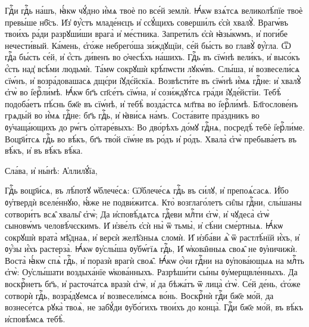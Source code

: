 \cuLettrine
Гдⷭ҇и гдⷭ҇ь на́шъ, ꙗ҆́кѡ чꙋ́дно и҆́мѧ твоѐ по все́й  землѝ. 
\hKv Ꙗ҆́кѡ взѧ́тсѧ великолѣ́пїе твоѐ превы́ше  нб҃съ. 
\hKv И҆з̾ ᲂу҆́стъ младе́нєцъ и҆ ссꙋ́щихъ  соверши́лъ є҆сѝ хвалꙋ̀. 
\hKv Врагѡ́въ твои́хъ ра́ди  разрꙋши́ши врага̀ и҆ ме́стника. 
\hKv Запрети́лъ є҆сѝ  ꙗ҆зы́кѡмъ, и҆ поги́бе нечести́вый. 
\hKv Ка́мень, є҆го́же  небрего́ша зи́ждꙋщїи, се́й бы́сть во главꙋ̀ ᲂу҆́гла. 
\hKv  Ѿ гдⷭ҇а бы́сть се́й, и҆ є҆́сть ди́венъ во ѻ҆чесѣ́хъ  на́шихъ. 
\hKv Гдⷭ҇ь въ сїѡ́нѣ вели́къ, и҆ высо́къ є҆́сть  над̾ всѣ́ми людьмѝ. 
\hKv Та́мѡ сокрꙋшѝ крѣ́пѡсти  лꙋкѡ́въ. 
\hKv Слы́ша, и҆ возвесели́сѧ сїѡ́нъ, и҆  возра́довашасѧ дщє́ри і҆ꙋдє́йскїѧ. 
\hKv Возвѣсти́те въ  сїѡ́нѣ и҆́мѧ гдⷭ҇не: и҆ хвалꙋ̀ є҆гѡ̀ во і҆ерⷭ҇ли́мѣ. 
\hKv  Ꙗ҆́кѡ бг҃ъ сп҃се́тъ сїѡ́на, и҆ сози́ждꙋтсѧ гра́ди  і҆ꙋде́йстїи. 
\hKv Тебѣ̀ подоба́етъ пѣ́снь бж҃е въ сїѡ́нѣ,  и҆ тебѣ̀ возда́стсѧ мл҃тва во і҆ерⷭ҇ли́мѣ. 
\hKv  Бл҃гослове́нъ грѧды́й во и҆́мѧ гдⷭ҇не: бг҃ъ гдⷭ҇ь, и҆  ꙗ҆ви́сѧ на́мъ. 
\hKv Соста́вите пра́здникъ во  ᲂу҆чаща́ющихъ до рѡ́гъ ѻ҆лтаре́выхъ:  
\hKv Во дво́рѣхъ до́мꙋ гдⷭ҇нѧ, посредѣ̀ тебѐ і҆ерⷭ҇ли́ме.  
\hKv Воцр҃и́тсѧ гдⷭ҇ь во вѣ́къ, бг҃ъ тво́й сїѡ́не въ ро́дъ  и҆ ро́дъ. 
\hKv Хвала̀ є҆гѡ̀ пребыва́етъ въ вѣ́къ, и҆ въ  вѣ́къ вѣ́ка. 

\hKv Сла́ва, и҆ ны́нѣ: А҆ллилꙋ́їа,  





\cuLettrine
Гдⷭ҇ь воцр҃и́сѧ, въ лѣ́потꙋ ѡ҆блече́сѧ: 
\hKv  Ѡ҆блече́сѧ гдⷭ҇ь въ си́лꙋ, и҆ препоѧ́сасѧ. 
\hKv И҆́бо  ᲂу҆твердѝ вселе́ннꙋю, ꙗ҆́же не подви́житсѧ. 
\hKv Кто̀  возглаго́летъ си̑лы гдⷭ҇ни, слы́шаны сотвори́тъ всѧ̑ хвалы̑  є҆гѡ̀; 
\hKv Да и҆сповѣ́дѧтсѧ гдⷭ҇еви млⷭ҇ти є҆гѡ̀, и҆  чꙋдеса̀ є҆гѡ̀ сыновѡ́мъ человѣ́чєскимъ. 
\hKv И҆ и҆зве́лъ  є҆сѝ ны̀ ѿ тьмы̀, и҆ сѣ́ни сме́ртныѧ. 
\hKv Ꙗ҆́кѡ  сокрꙋшѝ врата̀ мѣ̑днаѧ, и҆ верєѝ  желѣ̑зныѧ сломѝ. 
\hKv И҆ и҆зба́ви ѧ҆̀ ѿ растлѣ́нїй  и҆́хъ, и҆ ᲂу҆́зы и҆́хъ растерза̀. 
\hKv Ꙗ҆́кѡ ᲂу҆слы́ша  ᲂу҆бѡ́гїѧ гдⷭ҇ь, 
\hKv И҆ ѡ҆кова̑нныѧ своѧ̑ не ᲂу҆ничижѝ.  
\hKv Воста̀ ꙗ҆́кѡ спѧ̀ гдⷭ҇ь, и҆ поразѝ врагѝ своѧ̑. 
\hKv  Ꙗ҆́кѡ ѻ҆́чи гдⷭ҇ни на ᲂу҆пова́ющыѧ на млⷭ҇ть є҆гѡ̀: 
\hKv  Оу҆слы́шати воздыха́нїе ѡ҆кова́нныхъ. 
\hKv Разрѣши́ти  сы́ны ᲂу҆мерщвле́нныхъ. 
\hKv Да воскрⷭ҇нетъ бг҃ъ, и҆  расточа́тсѧ вразѝ є҆гѡ̀, и҆ да бѣжа́тъ ѿ лица̀ є҆гѡ̀.  
\hKv Се́й де́нь, є҆го́же сотворѝ гдⷭ҇ь, возра́дꙋемсѧ и҆  возвесели́мсѧ во́нь. 
\hKv Воскрⷭ҇нѝ гдⷭ҇и бж҃е мо́й, да  вознесе́тсѧ рꙋка̀ твоѧ̀, не забꙋ́ди ᲂу҆бо́гихъ твои́хъ до  конца̀. 
\hKv Гдⷭ҇и бж҃е мо́й, въ вѣ́къ и҆сповѣ́мсѧ тебѣ̀. 

